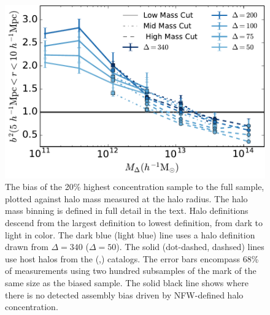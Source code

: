 \documentclass[usenatbib,fleqn]{mnras}
\begin{document}
\begin{figure}
	\centering
	\includegraphics[width=\columnwidth]{biasplot.pdf}
	\caption{
	The bias of the 20\% highest concentration sample to the full sample, plotted against halo mass measured at the halo radius. The halo mass binning is defined in full detail in the text. Halo definitions descend from the largest definition to lowest definition, from dark to light in color. The dark blue (light blue) line uses a halo definition drawn from $\Delta = 340$ ($\Delta = 50$). The solid (dot-dashed, dashsed) lines use host halos from the \simA (\simB,\simC) catalogs. The
	error bars encompass 68\% of measurements using two hundred subsamples
	of the mark of the same size as the biased sample. The solid black line
	shows where there is no detected assembly bias driven by NFW-defined halo concentration.}
	\label{fig:biascompare}
\end{figure}


\end{document}
